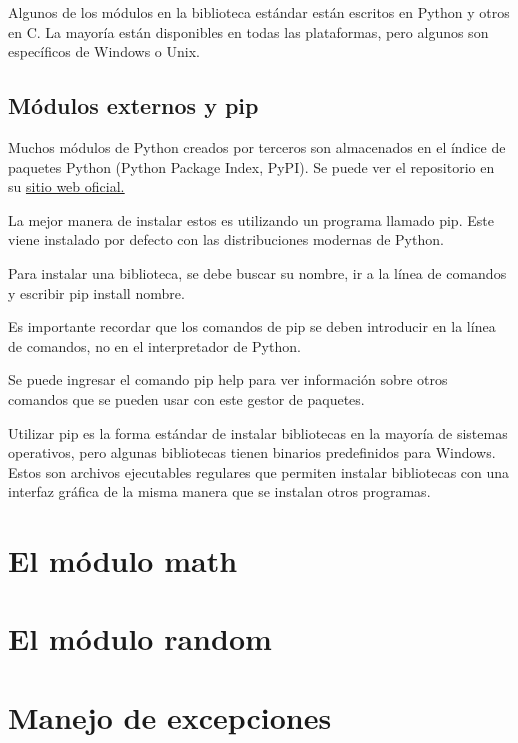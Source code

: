 \documentclass{report}
\begin{document}
{Algunos de los módulos en la biblioteca estándar están escritos en Python y otros en C. La mayoría están disponibles en todas las plataformas, pero algunos son específicos de Windows o Unix.

\section{Módulos externos y pip}

Muchos módulos de Python creados por terceros son almacenados en el índice de paquetes Python (Python Package Index, PyPI). Se puede ver el repositorio en su \href{https://pypi.org}{\underline{sitio web oficial.}}

La mejor manera de instalar estos es utilizando un programa llamado pip. Este viene instalado por defecto con las distribuciones modernas de Python.

Para instalar una biblioteca, se debe buscar su nombre, ir a la línea de comandos y escribir pip install nombre.


Es importante recordar que los comandos de pip se deben introducir en la línea de comandos, no en el interpretador de Python.

Se puede ingresar el comando pip help para ver información sobre otros comandos que se pueden usar con este gestor de paquetes.


Utilizar pip es la forma estándar de instalar bibliotecas en la mayoría de sistemas operativos, pero algunas bibliotecas tienen binarios predefinidos para Windows. Estos son archivos ejecutables regulares que permiten instalar bibliotecas con una interfaz gráfica de la misma manera que se instalan otros programas.

\clearpage\chapter{El módulo math}

\clearpage\chapter{El módulo random}

\clearpage\chapter{Manejo de excepciones}

}
\end{document}
